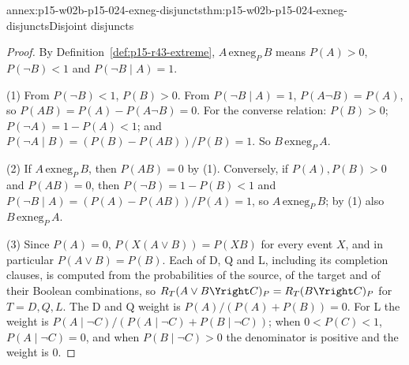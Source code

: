 \begin{annexitem}{annex:p15-w02b-p15-024-exneg-disjuncts}{thm:p15-w02b-p15-024-exneg-disjuncts}{Disjoint disjuncts}
\begin{proof}
By Definition~\ref{def:p15-r43-extreme}, \(A\,\mathrm{exneg}_P\,B\)
means \(P(A)>0\), \(P(\neg B)<1\) and \(P(\neg B\mid A)=1\).

(1) From \(P(\neg B)<1\), \(P(B)>0\). From \(P(\neg B\mid A)=1\),
\(P(A\neg B)=P(A)\), so \(P(AB)=P(A)-P(A\neg B)=0\). For the converse
relation: \(P(B)>0\); \(P(\neg A)=1-P(A)<1\); and
\(P(\neg A\mid B)=(P(B)-P(AB))/P(B)=1\). So \(B\,\mathrm{exneg}_P\,A\).

(2) If \(A\,\mathrm{exneg}_P\,B\), then \(P(AB)=0\) by (1).
Conversely, if \(P(A),P(B)>0\) and \(P(AB)=0\), then
\(P(\neg B)=1-P(B)<1\) and
\(P(\neg B\mid A)=(P(A)-P(AB))/P(A)=1\), so \(A\,\mathrm{exneg}_P\,B\);
by (1) also \(B\,\mathrm{exneg}_P\,A\).

(3) Since \(P(A)=0\), \(P(X(A\vee B))=P(XB)\) for every event \(X\),
and in particular \(P(A\vee B)=P(B)\). Each of D, Q and L, including
its completion clauses, is computed from the probabilities of the
source, of the target and of their Boolean combinations, so
\(R_T(A\vee B\Yright C)_P=R_T(B\Yright C)_P\) for \(T=D,Q,L\). The
D and Q weight is \(P(A)/(P(A)+P(B))=0\). For L the weight is
\(P(A\mid\neg C)/(P(A\mid\neg C)+P(B\mid\neg C))\); when
\(0<P(C)<1\), \(P(A\mid\neg C)=0\), and when \(P(B\mid\neg C)>0\) the
denominator is positive and the weight is \(0\).
\end{proof}
\end{annexitem}
